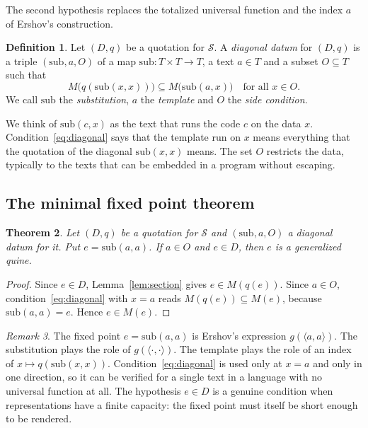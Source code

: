 \documentclass[11pt]{amsart}
\newtheorem{theorem}{Theorem}[section]
\theoremstyle{definition}
\newtheorem{definition}[theorem]{Definition}
\theoremstyle{remark}
\newtheorem{remark}[theorem]{Remark}
\newcommand{\sub}{\mathrm{sub}}
\newcommand{\M}{M}
\begin{document}
The second hypothesis replaces the totalized universal function and the index $a$ of Ershov's
construction.

\begin{definition}\label{def:diagonal}
Let $(D,q)$ be a quotation for $\mathcal{S}$. A \emph{diagonal datum} for $(D,q)$ is a triple
$(\sub, a, O)$ of a map $\sub \colon T \times T \to T$, a text $a \in T$ and a subset $O \subseteq
T$ such that
\begin{equation}\label{eq:diagonal}
  \M\bigl(q(\sub(x,x))\bigr) \subseteq \M\bigl(\sub(a,x)\bigr) \quad \text{for all } x \in O.
\end{equation}
We call $\sub$ the \emph{substitution}, $a$ the \emph{template} and $O$ the \emph{side condition}.
\end{definition}

We think of $\sub(c,x)$ as the text that runs the code $c$ on the data $x$.
Condition~\eqref{eq:diagonal} says that the template run on $x$ means everything that the quotation
of the diagonal $\sub(x,x)$ means. The set $O$ restricts the data, typically to the texts that can
be embedded in a program without escaping.

\subsection{The minimal fixed point theorem}

\begin{theorem}\label{thm:minimal}
Let $(D,q)$ be a quotation for $\mathcal{S}$ and $(\sub,a,O)$ a diagonal datum for it. Put $e =
\sub(a,a)$. If $a \in O$ and $e \in D$, then $e$ is a generalized quine.
\end{theorem}

\begin{proof}
Since $e \in D$, Lemma~\ref{lem:section} gives $e \in \M(q(e))$. Since $a \in O$,
condition~\eqref{eq:diagonal} with $x = a$ reads $\M(q(e)) \subseteq \M(e)$, because $\sub(a,a) =
e$. Hence $e \in \M(e)$.
\end{proof}

\begin{remark}\label{rem:ershov}
The fixed point $e = \sub(a,a)$ is Ershov's expression $g(\langle a,a\rangle)$. The substitution
plays
the role of $g(\langle \cdot,\cdot \rangle)$. The template plays the role of an index of $x \mapsto
q(\sub(x,x))$. Condition~\eqref{eq:diagonal} is used only at $x = a$ and only in one direction, so
it can be verified for a single text in a language with no universal function at all. The
hypothesis $e \in D$ is a genuine condition when representations have a finite capacity: the fixed
point must itself be short enough to be rendered.
\end{remark}
\end{document}
